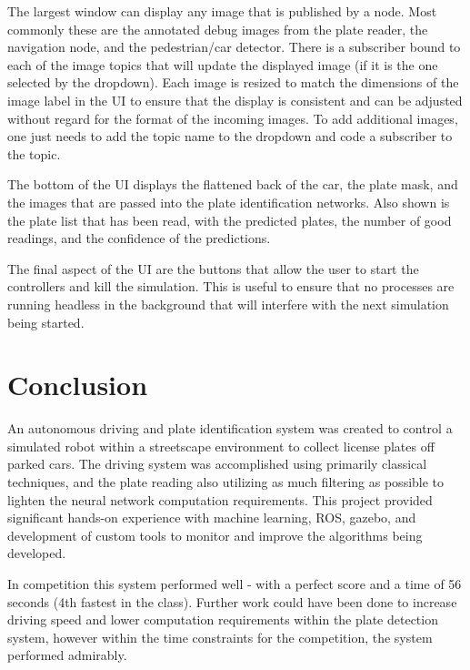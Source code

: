 \documentclass[titlepage, twocolumn]{article}
\begin{document}
The largest window can display any image that is published by a node. Most commonly these are the annotated debug images from the plate reader, the navigation node, and the pedestrian/car detector. There is a subscriber bound to each of the image topics that will update the displayed image (if it is the one selected by the dropdown). Each image is resized to match the dimensions of the image label in the UI to ensure that the display is consistent and can be adjusted without regard for the format of the incoming images.
To add additional images, one just needs to add the topic name to the dropdown and code a subscriber to the topic.

The bottom of the UI displays the flattened back of the car, the plate mask, and the images that are passed into the plate identification networks. Also shown is the plate list that has been read, with the predicted plates, the number of good readings, and the confidence of the predictions.

The final aspect of the UI are the buttons that allow the user to start the controllers and kill the simulation. This is useful to ensure that no processes are running headless in the background that will interfere with the next simulation being started. 

\section{Conclusion}

An autonomous driving and plate identification system was created to control a simulated robot within a streetscape environment to collect license plates off parked cars. The driving system was accomplished using primarily classical techniques, and the plate reading also utilizing as much filtering as possible to lighten the neural network computation requirements. This project provided significant hands-on experience with machine learning, ROS, gazebo, and development of custom tools to monitor and improve the algorithms being developed. 

In competition this system performed well - with a perfect score and a time of 56 seconds (4th fastest in the class). Further work could have been done to increase driving speed and lower computation requirements within the plate detection system, however within the time constraints for the competition, the system performed admirably. 
\end{document}
